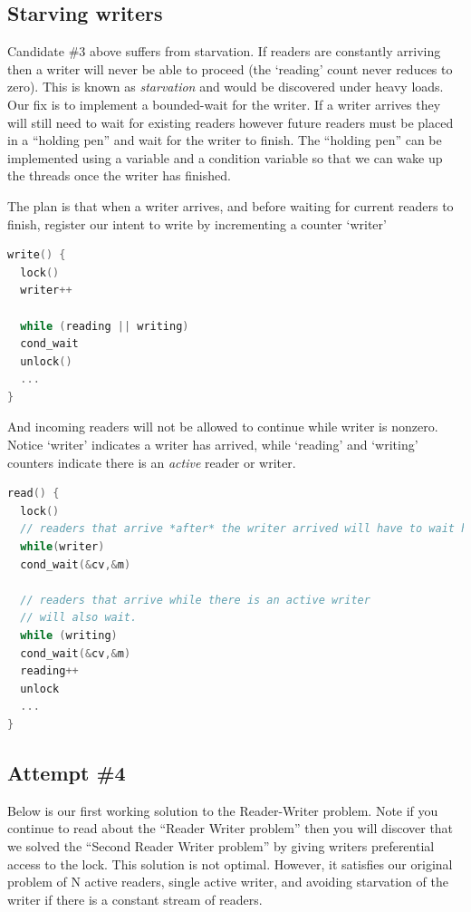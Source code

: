 \subsection{Starving writers}

Candidate \#3 above suffers from starvation.
If readers are constantly arriving then a writer will never be able to proceed (the `reading' count never reduces to zero).
This is known as \emph{starvation} and would be discovered under heavy loads.
Our fix is to implement a bounded-wait for the writer.
If a writer arrives they will still need to wait for existing readers however future readers must be placed in a ``holding pen'' and wait for the writer to finish.
The ``holding pen'' can be implemented using a variable and a condition variable so that we can wake up the threads once the writer has finished.

The plan is that when a writer arrives, and before waiting for current readers to finish, register our intent to write by incrementing a counter `writer'

\begin{lstlisting}[language=C]
write() {
  lock()
  writer++

  while (reading || writing)
  cond_wait
  unlock()
  ...
}
\end{lstlisting}

And incoming readers will not be allowed to continue while writer is nonzero.
Notice `writer' indicates a writer has arrived, while `reading' and `writing' counters indicate there is an \emph{active} reader or writer.

\begin{lstlisting}[language=C]
read() {
  lock()
  // readers that arrive *after* the writer arrived will have to wait here!
  while(writer)
  cond_wait(&cv,&m)

  // readers that arrive while there is an active writer
  // will also wait.
  while (writing)
  cond_wait(&cv,&m)
  reading++
  unlock
  ...
}
\end{lstlisting}

\subsection{Attempt \#4}

Below is our first working solution to the Reader-Writer problem.
Note if you continue to read about the ``Reader Writer problem'' then you will discover that we solved the ``Second Reader Writer problem'' by giving writers preferential access to the lock.
This solution is not optimal.
However, it satisfies our original problem of N active readers, single active writer, and avoiding starvation of the writer if there is a constant stream of readers.

